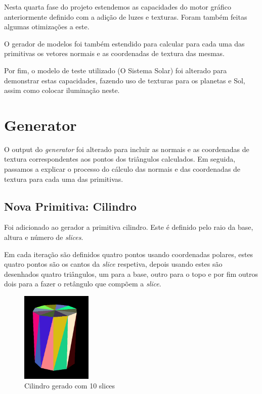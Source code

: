 \documentclass[a4paper]{article}
\begin{document}
Nesta quarta fase do projeto estendemos as capacidades do motor gráfico
anteriormente definido com a adição de luzes e texturas. Foram também feitas
algumas otimizações a este.

O gerador de modelos foi também estendido para calcular para cada uma das
primitivas os vetores normais e as coordenadas de textura das mesmas.

Por fim, o modelo de teste utilizado (O Sistema Solar) foi alterado para
demonstrar estas capacidades, fazendo uso de texturas para os planetas e Sol,
assim como colocar iluminação neste.


\section{Generator}

O output do \textit{generator} foi alterado para incluir as normais e as
coordenadas de textura correspondentes aos pontos dos triângulos calculados.
Em seguida, passamos a explicar o processo do cálculo das normais e das
coordenadas de textura para cada uma das primitivas.

\subsection{Nova Primitiva: Cilindro}

Foi adicionado ao gerador a primitiva cilindro. Este é definido pelo raio da
base, altura e número de \textit{slices}.

Em cada iteração são definidos quatro pontos usando coordenadas polares, estes
quatro pontos são os cantos da \textit{slice} respetiva, depois usando estes são
desenhados quatro triângulos, um para a base, outro para o topo e por fim
outros dois para a fazer o retângulo que compõem a \textit{slice}.

\begin{figure}[H]
    \centering
    \includegraphics[width=0.3\textwidth]{cylinder_colored.png}
    \caption{Cilindro gerado com 10 slices}
\end{figure}
\end{document}
